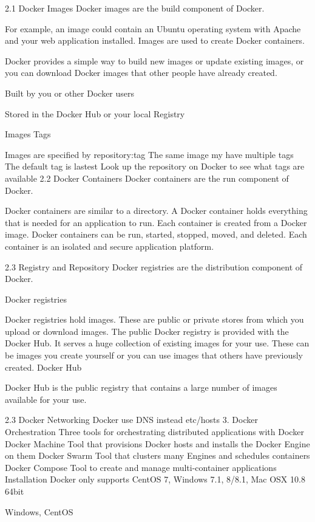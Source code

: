 2.1 Docker Images
Docker images are the build component of Docker.

For example, an image could contain an Ubuntu operating system with Apache and your web application installed. Images are used to create Docker containers.

Docker provides a simple way to build new images or update existing images, or you can download Docker images that other people have already created.

Built by you or other Docker users

Stored in the Docker Hub or your local Registry

Images Tags

Images are specified by repository:tag
The same image my have multiple tags
The default tag is lastest
Look up the repository on Docker to see what tags are available
2.2 Docker Containers
Docker containers are the run component of Docker.

Docker containers are similar to a directory. A Docker container holds everything that is needed for an application to run. Each container is created from a Docker image. Docker containers can be run, started, stopped, moved, and deleted. Each container is an isolated and secure application platform.

2.3 Registry and Repository
Docker registries are the distribution component of Docker.

Docker registries

Docker registries hold images. These are public or private stores from which you upload or download images. The public Docker registry is provided with the Docker Hub. It serves a huge collection of existing images for your use. These can be images you create yourself or you can use images that others have previously created. Docker Hub

Docker Hub is the public registry that contains a large number of images available for your use.

2.3 Docker Networking
Docker use DNS instead etc/hosts
3. Docker Orchestration
Three tools for orchestrating distributed applications with Docker
Docker Machine
Tool that provisions Docker hosts and installs the Docker Engine on them
Docker Swarm
Tool that clusters many Engines and schedules containers
Docker Compose
Tool to create and manage multi-container applications
Installation
Docker only supports CentOS 7,  Windows 7.1, 8/8.1, Mac OSX 10.8 64bit

Windows, CentOS

